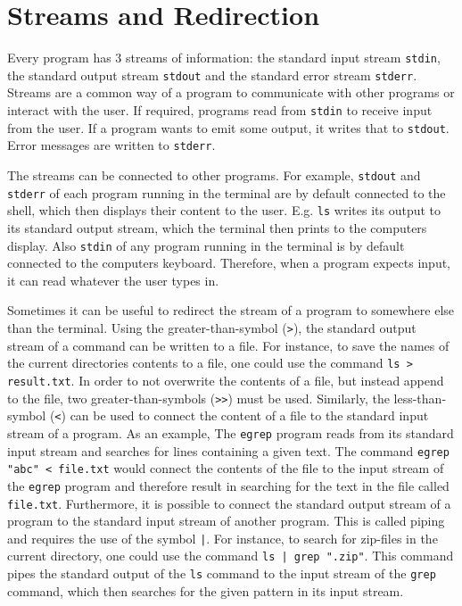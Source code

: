\section{Streams and Redirection}

Every program has 3 streams of information: the standard input stream \lstinline{stdin}, the standard output stream \lstinline{stdout} and the standard error stream \lstinline{stderr}. Streams are a common  way of a program to communicate with other programs or interact with the user. If required, programs read from \lstinline{stdin} to receive input from the user. If a program wants to emit some output, it writes that to \lstinline{stdout}. Error messages are written to \lstinline{stderr}.

The streams can be connected to other programs. For example, \lstinline{stdout} and \lstinline{stderr} of each program running in the terminal are by default connected to the shell, which then displays their content to the user. E.g. \lstinline{ls} writes its output to its standard output stream, which the terminal then prints to the computers display. Also \lstinline{stdin} of any program running in the terminal is by default connected to the computers keyboard. Therefore, when a program expects input, it can read whatever the user types in.

Sometimes it can be useful to redirect the stream of a program to somewhere else than the terminal. Using the greater-than-symbol (\lstinline{>}), the standard output stream of a command can be written to a file. For instance, to save the names of the current directories contents to a file, one could use the command \lstinline{ls > result.txt}. In order to not overwrite the contents of a file, but instead append to the file, two greater-than-symbols (\lstinline{>>}) must be used. Similarly, the less-than-symbol (\lstinline{<}) can be used to connect the content of a file to the standard input stream of a program. As an example, The \lstinline{egrep} program reads from its standard input stream and searches for lines containing a given text. The command \lstinline{egrep "abc" < file.txt} would connect the contents of the file to the input stream of the \lstinline{egrep} program and therefore result in searching for the text  in the file called \lstinline{file.txt}. Furthermore, it is possible to connect the standard output stream of a program to the standard input stream of another program. This is called piping and requires the use of the symbol \lstinline{|}. For instance, to search for zip-files in the current directory, one could use the command \lstinline{ls | grep ".zip"}. This command pipes the standard output of the \lstinline{ls} command to the input stream of the \lstinline{grep} command, which then searches for the given pattern in its input stream.
